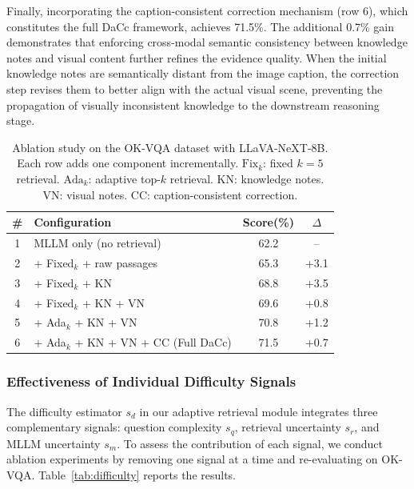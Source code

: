 \documentclass[manuscript,screen,review]{acmart}
\begin{document}
Finally, incorporating the caption-consistent correction mechanism (row 6), which constitutes the full DaCc framework, achieves 71.5\%. The additional 0.7\% gain demonstrates that enforcing cross-modal semantic consistency between knowledge notes and visual content further refines the evidence quality. When the initial knowledge notes are semantically distant from the image caption, the correction step revises them to better align with the actual visual scene, preventing the propagation of visually inconsistent knowledge to the downstream reasoning stage.

\begin{table}[t]
\centering
\caption{Ablation study on the OK-VQA dataset with LLaVA-NeXT-8B. Each row adds one component incrementally. $\text{Fix}_k$: fixed $k=5$ retrieval. $\text{Ada}_k$: adaptive top-$k$ retrieval. KN: knowledge notes. VN: visual notes. CC: caption-consistent correction.}
\label{tab:ablation}
\begin{tabular}{c l c c}
\hline
\# & Configuration & Score(\%) & $\Delta$ \\
\hline
1 & MLLM only (no retrieval)     & 62.2 & -- \\
2 & + Fixed$_k$ + raw passages    & 65.3 & +3.1 \\
3 & + Fixed$_k$ + KN              & 68.8 & +3.5 \\
4 & + Fixed$_k$ + KN + VN         & 69.6 & +0.8 \\
5 & + Ada$_k$ + KN + VN           & 70.8 & +1.2 \\
6 & + Ada$_k$ + KN + VN + CC (Full DaCc) & 71.5 & +0.7 \\
\hline
\end{tabular}
\end{table}

\subsubsection{Effectiveness of Individual Difficulty Signals}

The difficulty estimator $s_d$ in our adaptive retrieval module integrates three complementary signals: question complexity $s_q$, retrieval uncertainty $s_r$, and MLLM uncertainty $s_m$. To assess the contribution of each signal, we conduct ablation experiments by removing one signal at a time and re-evaluating on OK-VQA. Table~\ref{tab:difficulty} reports the results.
\end{document}
